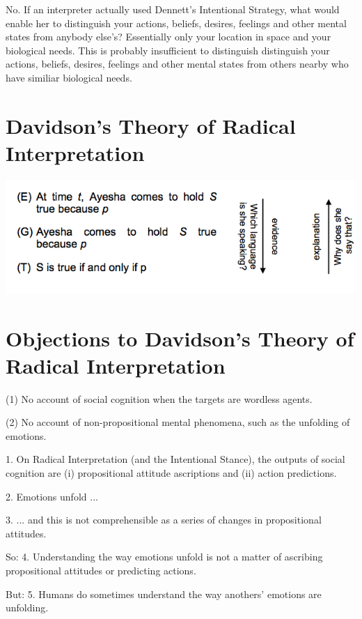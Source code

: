 \documentclass[12pt]{extarticle}
\begin{document}
\begin{multicols*}{3}
No.  If an interpreter actually used Dennett’s Intentional Strategy,
what would enable her to distinguish your actions, beliefs, desires,
feelings and other mental states from anybody else’s?
Essentially only your location in space and your biological needs.
This is probably insufficient to distinguish
distinguish your actions, beliefs, desires, feelings and other mental
states from others nearby who have similiar biological needs.



\section{Davidson’s Theory of Radical Interpretation}

\begin{center}
\includegraphics[scale=0.3]{img/radical_interpretation_handout.png}
\end{center}



\section{Objections to Davidson’s Theory of Radical Interpretation}

(1) No account of social cognition when the targets are wordless agents.

(2) No account of non-propositional mental phenomena, such as the unfolding of emotions.

1. On Radical Interpretation (and the Intentional Stance), the outputs of social cognition are (i) propositional attitude ascriptions and (ii) action predictions.

2. Emotions unfold ...

3. ... and this is not comprehensible as a series of changes in propositional attitudes.

So: 4. Understanding the way emotions unfold is not a matter of ascribing propositional attitudes or predicting actions.

But: 5. Humans do sometimes understand the way anothers’ emotions are unfolding.


\end{multicols*}
\end{document}
